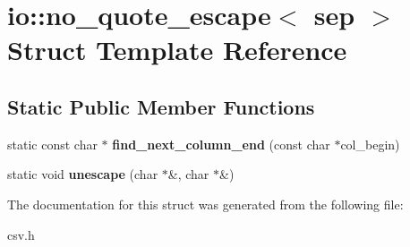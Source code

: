 \section{io\+:\+:no\+\_\+quote\+\_\+escape$<$ sep $>$ Struct Template Reference}
\label{structio_1_1no__quote__escape}
\subsection*{Static Public Member Functions}
\begin{DoxyCompactItemize}
\item 
static const char $\ast$ {\bfseries find\+\_\+next\+\_\+column\+\_\+end} (const char $\ast$col\+\_\+begin)\label{structio_1_1no__quote__escape_add17b043bb89445079a0448026ce86d0}

\item 
static void {\bfseries unescape} (char $\ast$\&, char $\ast$\&)\label{structio_1_1no__quote__escape_af1c217f2c995d178a91c58235191b052}

\end{DoxyCompactItemize}


The documentation for this struct was generated from the following file\+:\begin{DoxyCompactItemize}
\item 
csv.\+h\end{DoxyCompactItemize}
